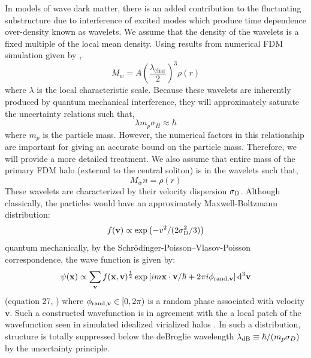 \documentclass[usenatbib]{mnras}
\begin{document}
In models of wave dark matter, there is an added contribution to the fluctuating substructure due to interference of excited modes which produce time dependence over-density known as wavelets. We assume that the density of the wavelets is a fixed multiple of the local mean density. Using results from numerical FDM simulation given by \cite{BECDM},
\begin{equation} \label{mutiple_of_background}
M_w = A \left(\frac{\lambda_{\text{char}}}{2} \right)^3 \rho(r) 
\end{equation}  
where $\lambda$ is the local characteristic scale. Because these wavelets are inherently produced by quantum mechanical interference, they will approximately saturate the uncertainty relations such that,
\begin{equation}
\lambda m_p \sigma_H \approx \hbar
\end{equation}
where $m_p$ is the particle mass. However, the numerical factors in this relationship are important for giving an accurate bound on the particle mass. Therefore, we will provide a more detailed treatment. We also assume that entire mass of the primary FDM halo (external to the central soliton) is in the wavelets such that,
\begin{equation} \label{const}
M_w n = \rho(r)
\end{equation}
These wavelets are characterized by their velocity dispersion 
$\sigma_{\rm D}$.
Although classically, the particles would have an approximately Maxwell-Boltzmann distribution:
\begin{equation}
f(\mathbf{v}) \propto \exp\left(-v^2/(2\sigma_{\rm D}^2/3)\right)
\end{equation}
quantum mechanically, by the Schr\"{o}dinger-Poisson–Vlasov-Poisson correspondence, the wave function is given by:
\begin{equation} \label{phase_dist}
\psi(\mathbf{x}) \propto \sum_{\mathbf{v}} f(\mathbf{x},\mathbf{v})^{\frac{1}{2}} \exp{\left[i m \mathbf{x}\cdot\mathbf{v}/\hbar + 2\pi i \phi_{{\rm rand},\mathbf{v}} \right]}
\, \mathrm{d}^{3}{\mathbf{v}}
\end{equation}
(equation 27, \cite{Schrodinger-Poisson}) where $\phi_{{\rm rand},\mathbf{v}}\in[0,2\pi)$ is a random phase associated with velocity $\mathbf{v}$.
Such a constructed wavefunction is in agreement with the a local patch of the wavefunction seen in simulated idealized virialized halos \citep{BECDM}.
In such a distribution, structure is totally suppressed below the deBroglie wavelength $\lambda_{\rm dB} \equiv \hbar/(m_p\sigma_D)$ by the uncertainty principle.
\end{document}
